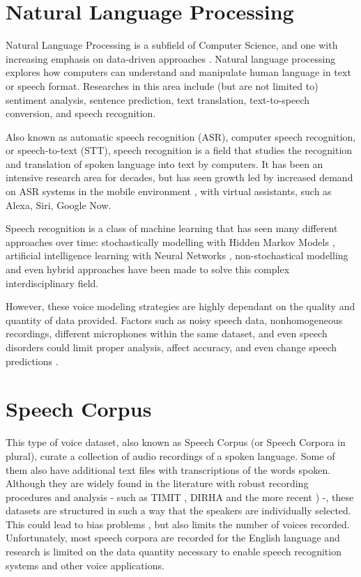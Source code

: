 \section*{Natural Language Processing}

Natural Language Processing is a subfield of Computer Science, and one with increasing emphasis on data-driven approaches \cite{moore2003comparison}. Natural language processing explores how computers can understand and manipulate human language in text or speech format. Researches in this area include (but are not limited to) sentiment analysis, sentence prediction, text translation, text-to-speech conversion, and speech recognition.

Also known as automatic speech recognition (ASR), computer speech recognition, or speech-to-text (STT), speech recognition is a field that studies the recognition and translation of spoken language into text by computers. It has been an intensive research area for decades, but has seen growth led by increased demand on ASR systems in the mobile environment \cite{yu2016automatic}, with virtual assistants, such as Alexa, Siri, Google Now.

Speech recognition is a class of machine learning that has seen many different approaches over time: stochastically modelling with Hidden Markov Models  \cite{gales2008application}, artificial intelligence learning with Neural Networks \cite{graves2013speech}, non-stochastical modelling \cite{burget2003nonrandomattr} and even hybrid approaches \cite{wang2020transformer} have been made to solve this complex interdisciplinary field.

However, these voice modeling strategies are highly dependant on the quality and quantity of data provided. Factors such as noisy speech data, nonhomogeneous recordings, different microphones within the same dataset, and even speech disorders could limit proper analysis, affect accuracy, and even change speech predictions \cite{cooke2001robust}. 

\section*{Speech Corpus}

This type of voice dataset, also known as Speech Corpus (or Speech Corpora in plural), curate a collection of audio recordings of a spoken language. Some of them also have additional text files with transcriptions of the words spoken. Although they are widely found in the literature with robust recording procedures and analysis - such as TIMIT \cite{Lamel1992timmit}, DIRHA \cite{Ravanelli2016dirha} and the more recent \cite{chanchaochai2018globaltimit}) -, these datasets are structured in such a way that the speakers are individually selected. This could lead to bias problems \cite{bender2018data}, but also limits the number of voices recorded. Unfortunately, most speech corpora are recorded for the English language \cite{LeRouxVincent2014TRdatasets} and research is limited on the data quantity necessary to enable speech recognition systems and other voice applications.

